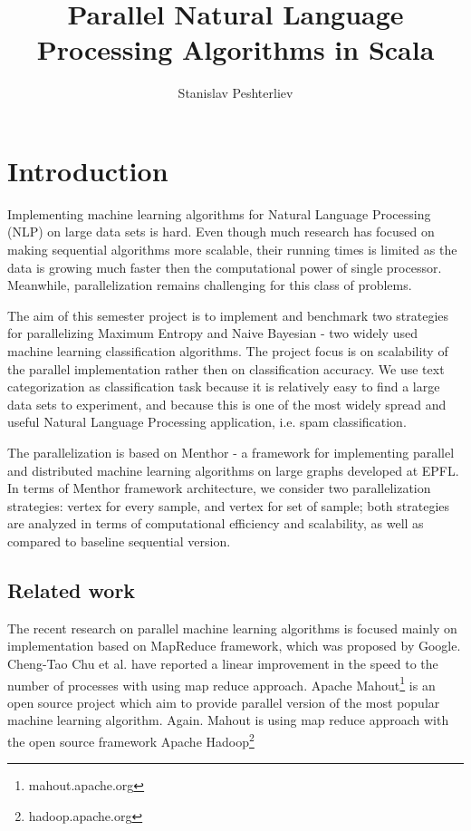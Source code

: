 \documentclass{report}
\author{Stanislav Peshterliev}
\title{Parallel Natural Language Processing Algorithms in Scala}
\begin{document}
\maketitle

\tableofcontents

\chapter{Introduction}

Implementing machine learning algorithms for Natural Language Processing (NLP) on large data sets is hard.  Even though much research has focused on making sequential algorithms more scalable, their running times is limited as the data is growing much faster then the computational power of single processor. Meanwhile, parallelization remains challenging for this class of problems. 

The aim of this semester project is to implement and benchmark two strategies for parallelizing Maximum Entropy\cite{berger_a1-etal:1996a} and Naive Bayesian\cite{Rennie03} - two widely used machine learning classification algorithms.  The project focus is on scalability of the parallel implementation rather then on classification accuracy. We use text categorization as classification task because it is relatively easy to find a large data sets to experiment, and  because this is one of the most widely spread and useful Natural Language Processing application, i.e. spam classification.

The parallelization is based on Menthor\cite{oai:infoscience.epfl.ch:165111} - a framework for implementing parallel and distributed machine learning algorithms on large graphs developed at EPFL. In terms of Menthor framework architecture, we consider two parallelization strategies: vertex for every sample, and vertex for set of sample; both strategies are analyzed in terms of computational efficiency and scalability, as well as compared to baseline sequential version.

\section{Related work}

The recent research on parallel machine learning algorithms is focused mainly on implementation based on MapReduce\cite{Dean:2008:MSD:1327452.1327492} framework, which was proposed by Google. Cheng-Tao Chu et al. have reported a linear improvement in the speed to the number of processes \cite{conf/nips/ChuKLYBNO06} with using map reduce approach. Apache Mahout\footnote{mahout.apache.org} is an open source project which aim to provide parallel version of the most popular machine learning algorithm. Again. Mahout is using map reduce approach with the open source framework Apache Hadoop\footnote{hadoop.apache.org}
\end{document}
